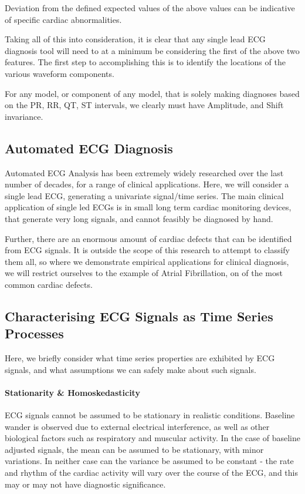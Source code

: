 \documentclass[9pt,conference]{IEEEtran}
\begin{document}
Deviation from the defined expected values of the above values can be indicative of specific cardiac abnormalities\cite{cardioBook}.

Taking all of this into consideration, it is clear that any single lead ECG diagnosis tool will need to at a minimum be considering the first of the above two features. The first step to accomplishing this is to identify the locations of the various waveform components.

For any model, or component of any model, that is solely making diagnoses based on the PR, RR, QT, ST intervals, we clearly must have Amplitude, and Shift invariance.

\subsection{Automated ECG Diagnosis}
Automated ECG Analysis has been extremely widely researched over the last number of decades, for a range of clinical applications. Here, we will consider a single lead ECG, generating a univariate signal/time series. The main clinical application of single led ECGs is in small long term cardiac monitoring devices, that generate very long signals, and cannot feasibly be diagnosed by hand.

Further, there are an enormous amount of cardiac defects that can be identified from ECG signals. It is outside the scope of this research to attempt to classify them all, so where we demonstrate empirical applications for clinical diagnosis, we will restrict ourselves to the example of Atrial Fibrillation, on of the most common cardiac defects.

\subsection{Characterising ECG Signals as Time Series Processes}
Here, we briefly consider what time series properties are exhibited by ECG signals, and what assumptions we can safely make about such signals.

\paragraph{Stationarity \& Homoskedasticity}
ECG signals cannot be assumed to be stationary in realistic conditions. Baseline wander is observed due to external electrical interference, as well as other biological factors such as respiratory and muscular activity. In the case of baseline adjusted signals, the mean can be assumed to be stationary, with minor variations. In neither case can the variance be assumed to be constant - the rate and rhythm of the cardiac activity will vary over the course of the ECG, and this may or may not have diagnostic significance.
\end{document}
